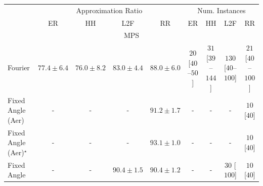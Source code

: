 \begin{tabular}{l|cccc|cccc|}
\toprule
& \multicolumn{4}{c|}{Approximation Ratio} & \multicolumn{4}{c|}{Num. Instances} \\
            & ER & HH & L2F & RR & ER & HH & L2F & RR \\
\midrule
\multicolumn{9}{c}{\rule{0pt}{8pt}MPS} \\
\midrule
Fourier & {\cellcolor[HTML]{FECB5F}} \color[HTML]{000000} $77.4\pm 6.4$ & {\cellcolor[HTML]{FED97C}} \color[HTML]{000000} $76.0\pm 8.2$ & {\cellcolor[HTML]{F3801C}} \color[HTML]{F1F1F1} $83.0\pm 4.4$ & {\cellcolor[HTML]{C04602}} \color[HTML]{F1F1F1} $88.0\pm 6.0$ & {\cellcolor[HTML]{FFF5F1}} \color[HTML]{000000} $20$ [$40$--$50$] & {\cellcolor[HTML]{FFF3EF}} \color[HTML]{000000} $31$ [$39$--$144$] & {\cellcolor[HTML]{FDDBD7}} \color[HTML]{000000} $130$ [$40$--$100$] & {\cellcolor[HTML]{FFF5F1}} \color[HTML]{000000} $21$ [$40$--$100$] \\
Fixed Angle (Aer) & {\cellcolor[HTML]{000000}} \color[HTML]{F1F1F1} {\cellcolor{white}} \color{black} - & {\cellcolor[HTML]{000000}} \color[HTML]{F1F1F1} {\cellcolor{white}} \color{black} - & {\cellcolor[HTML]{000000}} \color[HTML]{F1F1F1} {\cellcolor{white}} \color{black} - & {\cellcolor[HTML]{892F05}} \color[HTML]{F1F1F1} $91.2\pm 1.7$ & {\cellcolor[HTML]{000000}} \color[HTML]{F1F1F1} {\cellcolor{white}} \color{black} - & {\cellcolor[HTML]{000000}} \color[HTML]{F1F1F1} {\cellcolor{white}} \color{black} - & {\cellcolor[HTML]{000000}} \color[HTML]{F1F1F1} {\cellcolor{white}} \color{black} - & {\cellcolor[HTML]{FFF7F3}} \color[HTML]{000000} $10$ [$40$] \\
Fixed Angle (Aer)$^\star$ & {\cellcolor[HTML]{000000}} \color[HTML]{F1F1F1} {\cellcolor{white}} \color{black} - & {\cellcolor[HTML]{000000}} \color[HTML]{F1F1F1} {\cellcolor{white}} \color{black} - & {\cellcolor[HTML]{000000}} \color[HTML]{F1F1F1} {\cellcolor{white}} \color{black} - & {\cellcolor[HTML]{6B2606}} \color[HTML]{F1F1F1} $93.1\pm 1.0$ & {\cellcolor[HTML]{000000}} \color[HTML]{F1F1F1} {\cellcolor{white}} \color{black} - & {\cellcolor[HTML]{000000}} \color[HTML]{F1F1F1} {\cellcolor{white}} \color{black} - & {\cellcolor[HTML]{000000}} \color[HTML]{F1F1F1} {\cellcolor{white}} \color{black} - & {\cellcolor[HTML]{FFF7F3}} \color[HTML]{000000} $10$ [$40$] \\
Fixed Angle & {\cellcolor[HTML]{000000}} \color[HTML]{F1F1F1} {\cellcolor{white}} \color{black} - & {\cellcolor[HTML]{000000}} \color[HTML]{F1F1F1} {\cellcolor{white}} \color{black} - & {\cellcolor[HTML]{983404}} \color[HTML]{F1F1F1} $90.4\pm 1.5$ & {\cellcolor[HTML]{983404}} \color[HTML]{F1F1F1} $90.4\pm 1.2$ & {\cellcolor[HTML]{000000}} \color[HTML]{F1F1F1} {\cellcolor{white}} \color{black} - & {\cellcolor[HTML]{000000}} \color[HTML]{F1F1F1} {\cellcolor{white}} \color{black} - & {\cellcolor[HTML]{FFF3EF}} \color[HTML]{000000} $30$ [$100$] & {\cellcolor[HTML]{FFF7F3}} \color[HTML]{000000} $10$ [$40$] \\

\end{tabular}
